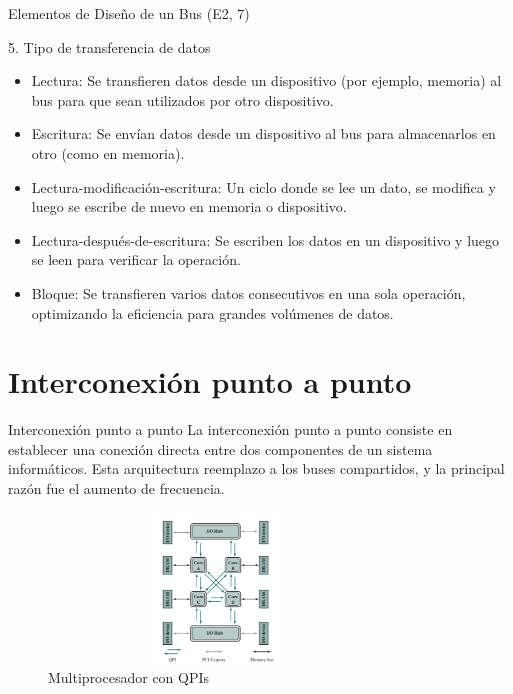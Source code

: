 \documentclass[presentation]{beamer}
\begin{document}
\begin{frame}[label={sec:orgeac6e69}]{Elementos de Diseño de un Bus (E2, 7)}
\begin{block}{5. Tipo de transferencia de datos}
\begin{itemize}
\item \alert{Lectura}: Se transfieren datos desde un dispositivo (por ejemplo, memoria) al bus para que sean utilizados por otro dispositivo.
\item \alert{Escritura}: Se envían datos desde un dispositivo al bus para almacenarlos en otro (como en memoria).
\item \alert{Lectura-modificación-escritura}: Un ciclo donde se lee un dato, se modifica y luego se escribe de nuevo en memoria o dispositivo.
\item \alert{Lectura-después-de-escritura}: Se escriben los datos en un dispositivo y luego se leen para verificar la operación.
\item \alert{Bloque}: Se transfieren varios datos consecutivos en una sola operación, optimizando la eficiencia para grandes volúmenes de datos.
\end{itemize}
\end{block}
\end{frame}


\section{Interconexión punto a punto}
\label{sec:org8b97689}
\begin{frame}[label={sec:orgffe67cd}]{Interconexión punto a punto}
La interconexión punto a punto consiste en establecer una conexión directa entre dos componentes de un sistema informáticos.
Esta arquitectura reemplazo a los buses compartidos, y la principal razón fue el aumento de frecuencia.

\begin{figure}[!h]
   \vspace{-0.1cm}
   \centering
   \includegraphics[height=4cm, width=0.8\textwidth]{./Images/image1.png}
   \vspace{-0.5cm} %
   \caption{Multiprocesador con QPIs}
   \label{fig:Representacion}
\end{figure}
\end{frame}
\end{document}
